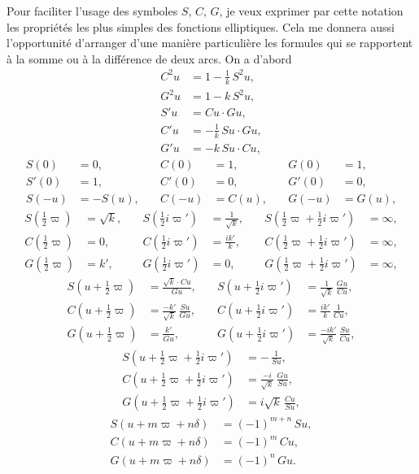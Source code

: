 \documentclass[11pt]{article}
\begin{document}
\noindent Pour faciliter l'usage des symboles $S$, $C$, $G$, je veux exprimer par cette notation les propri\'et\'es les plus simples des fonctions elliptiques. Cela me donnera aussi l'opportunit\'e d'arranger d'une mani\`ere particuli\`ere les formules qui se rapportent \`a la somme ou \`a la diff\'erence de deux arcs. On a d'abord
\[
\begin{aligned}
C^{2}u &= 1 - \tfrac{1}{k}\,S^{2}u,\\
G^{2}u &= 1 - k\,S^{2}u,\\
S'u &= Cu\cdot Gu,\\
C'u &= -\tfrac{1}{k}\,Su\cdot Gu,\\
G'u &= -k\,Su\cdot Cu,
\end{aligned}
\]
\[
\begin{aligned}
S(0) &= 0,\quad &C(0) &= 1,\quad &G(0) &= 1,\\
S'(0) &= 1,\quad &C'(0) &= 0,\quad &G'(0) &= 0,\\
S(-u) &= -S(u),\quad &C(-u) &= C(u),\quad &G(-u) &= G(u),
\end{aligned}
\]
\[
\begin{aligned}
S(\tfrac{1}{2}\varpi) &= \sqrt{k},\quad &S(\tfrac{1}{2}i\varpi') &= \tfrac{1}{\sqrt{k}},\quad &S(\tfrac{1}{2}\varpi + \tfrac{1}{2}i\varpi') &= \infty,\\
C(\tfrac{1}{2}\varpi) &= 0,\quad &C(\tfrac{1}{2}i\varpi') &= \tfrac{ik'}{k},\quad &C(\tfrac{1}{2}\varpi + \tfrac{1}{2}i\varpi') &= \infty,\\
G(\tfrac{1}{2}\varpi) &= k',\quad &G(\tfrac{1}{2}i\varpi') &= 0,\quad &G(\tfrac{1}{2}\varpi + \tfrac{1}{2}i\varpi') &= \infty,
\end{aligned}
\]
\[
\begin{aligned}
S(u + \tfrac{1}{2}\varpi) &= \frac{\sqrt{k}\cdot Cu}{Gu},\quad & S(u + \tfrac{1}{2}i\varpi') &= \frac{1}{\sqrt{k}}\,\frac{Gu}{Cu},\\
C(u + \tfrac{1}{2}\varpi) &= \frac{-k'}{\sqrt{k}}\,\frac{Su}{Gu},\quad & C(u + \tfrac{1}{2}i\varpi') &= \frac{ik'}{k}\,\frac{1}{Cu},\\
G(u + \tfrac{1}{2}\varpi) &= \frac{k'}{Gu},\quad & G(u + \tfrac{1}{2}i\varpi') &= \frac{-ik'}{\sqrt{k}}\,\frac{Su}{Cu},
\end{aligned}
\]
\[
\begin{aligned}
S(u + \tfrac{1}{2}\varpi + \tfrac{1}{2}i\varpi') &= -\,\frac{1}{Su},\\
C(u + \tfrac{1}{2}\varpi + \tfrac{1}{2}i\varpi') &= \frac{-i}{\sqrt{k}}\,\frac{Gu}{Su},\\
G(u + \tfrac{1}{2}\varpi + \tfrac{1}{2}i\varpi') &= i\sqrt{k}\,\frac{Cu}{Su},
\end{aligned}
\]
\[
\begin{aligned}
S(u + m\varpi + n\delta) &= (-1)^{m+n}\,Su,\\
C(u + m\varpi + n\delta) &= (-1)^{m}\,Cu,\\
G(u + m\varpi + n\delta) &= (-1)^{n}\,Gu.
\end{aligned}
\]
\end{document}

